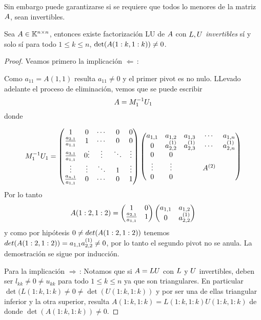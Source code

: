 Sin embargo puede garantizarse si se requiere que todos lo menores de la matriz $\Ab$,
sean invertibles.

\begin{tcolorbox}
[colback=black!15!white,colframe=black!75!black]
\begin{proposicion}\label{prop:menorenonulos}
 Sea $\Ab\in \Knn$, entonces existe factorización LU de $\Ab$ con $\Lb,\Ub$ \emph{invertibles} sí y solo sí
 para todo  $1\le k\le n$,  $\det(\Ab(1:k,1:k))\neq 0$.
\end{proposicion}

\end{tcolorbox}
 \begin{proof} Veamos primero la implicación $\Leftarrow\,$:


 Como $a_{11}=A(1,1)$ resulta $a_{11}\neq 0$ y el primer pivot es no nulo. LLevado adelante el proceso de eliminación, vemos que se puede escribir
$$
\Ab=\Mb_1^{-1}\Ub_1
$$
donde

$$
\Mb_1^{-1}\Ub_1=
\begin{pmatrix}
1 & 0 & \cdots & 0 & 0\\
\frac{a_{2,1}}{a_{1,1}} & 1 & \cdots & 0 & 0 \\
\frac{a_{3,1}}{a_{1,1}} & 0
\vdots  & \vdots  & \ddots & \vdots  \\
\vdots  & \vdots  & \ddots &1&  \vdots  \\
\frac{a_{n,1}}{a_{1,1}} &  0 & \cdots & 0& 1
\end{pmatrix}\begin{pmatrix}
a_{1,1}& a_{1,2} & a_{1,3} &\cdots & a_{1,n} \\
0 & a^{(1)}_{2,2} & a^{(1)}_{2,3} &\cdots & a^{(1)}_{2,n} \\
0 & 0 & &  &  \\
\vdots  & \vdots &  & \Ab^{(2)} &   \\
0 & 0&  &
\end{pmatrix}
$$
Por lo tanto
$$
\Ab(1:2,1:2)=\begin{pmatrix}
1 & 0 \\
\frac{a_{2,1}}{a_{1,1}} & 1\\
\end{pmatrix}\begin{pmatrix}
a_{1,1}& a_{1,2} \\
0 & a^{(1)}_{2,2}
\end{pmatrix}
$$
y como por hip\'otesis
$0\neq det(\Ab(1:2,1:2))$ tenemos $det(\Ab(1:2,1:2))=a_{1,1}a_{2,2}^{(1)}\neq 0$, por lo tanto el segundo pivot no se anula. La demostración se sigue por inducción.

Para la implicación $\Rightarrow\,$: Notamos que si $\Ab=\Lb\Ub$ con $\Lb$ y $\Ub$ invertibles, deben ser $l_{kk}\neq 0 \neq u_{kk}$ para todo $1\le k \le n$ ya que son triangulares. En particular $\det(L(1:k,1:k)\neq 0 \neq \det(U(1:k,1:k))$ y por ser  una de ellas triangular inferior y la otra superior, resulta $A(1:k,1:k)=L(1:k,1:k)U(1:k,1:k)$ de donde
$\det(A(1:k,1:k))\neq 0$.
 \end{proof}

